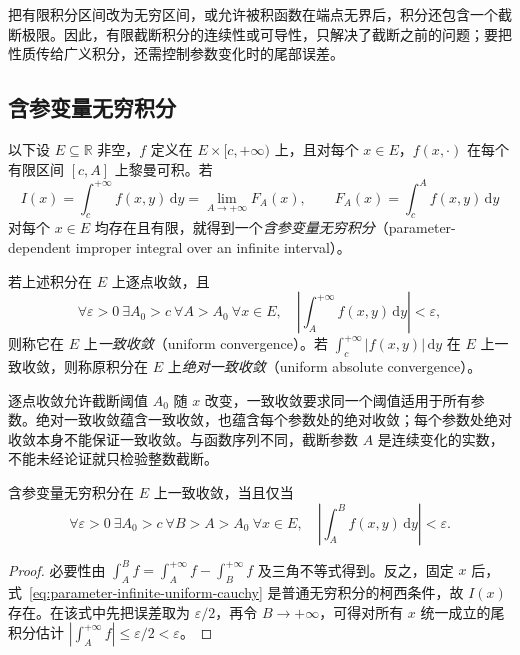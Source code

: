 把有限积分区间改为无穷区间，或允许被积函数在端点无界后，积分还包含一个截断极限。因此，有限截断积分的连续性或可导性，只解决了截断之前的问题；要把性质传给广义积分，还需控制参数变化时的尾部误差。

\subsection{含参变量无穷积分}
\label{subsec:parameter-dependent-infinite-integrals}

以下设 $E\subseteq\mathbb R$ 非空，$f$ 定义在 $E\times[c,+\infty)$ 上，且对每个 $x\in E$，$f(x,\cdot)$ 在每个有限区间 $[c,A]$ 上黎曼可积。若
\[
    I(x)=\int_c^{+\infty}f(x,y)\,\mathrm{d}y
    =\lim_{A\to+\infty}F_A(x),\qquad
    F_A(x)=\int_c^A f(x,y)\,\mathrm{d}y
\]
对每个 $x\in E$ 均存在且有限，就得到一个\emph{含参变量无穷积分}（parameter-dependent improper integral over an infinite interval）。

\begin{definition}[一致收敛与绝对一致收敛]
\label{def:parameter-infinite-uniform-convergence}
若上述积分在 $E$ 上逐点收敛，且
\begin{equation}
    \forall\varepsilon>0\ \exists A_0>c\ \forall A>A_0\ \forall x\in E,
    \quad\left|\int_A^{+\infty}f(x,y)\,\mathrm{d}y\right|<\varepsilon,
    \label{eq:parameter-infinite-uniform-tail}
\end{equation}
则称它在 $E$ 上\emph{一致收敛}（uniform convergence）。若 $\int_c^{+\infty}|f(x,y)|\,\mathrm{d}y$ 在 $E$ 上一致收敛，则称原积分在 $E$ 上\emph{绝对一致收敛}（uniform absolute convergence）。
\end{definition}

逐点收敛允许截断阈值 $A_0$ 随 $x$ 改变，一致收敛要求同一个阈值适用于所有参数。绝对一致收敛蕴含一致收敛，也蕴含每个参数处的绝对收敛；每个参数处绝对收敛本身不能保证一致收敛。与函数序列不同，截断参数 $A$ 是连续变化的实数，不能未经论证就只检验整数截断。

\begin{theorem}[一致收敛的柯西准则]
\label{thm:parameter-infinite-uniform-cauchy}
含参变量无穷积分在 $E$ 上一致收敛，当且仅当
\begin{equation}
    \forall\varepsilon>0\ \exists A_0>c\ \forall B>A>A_0\ \forall x\in E,
    \quad\left|\int_A^B f(x,y)\,\mathrm{d}y\right|<\varepsilon.
    \label{eq:parameter-infinite-uniform-cauchy}
\end{equation}
\end{theorem}

\begin{proof}
必要性由 $\int_A^B f=\int_A^{+\infty}f-\int_B^{+\infty}f$ 及三角不等式得到。反之，固定 $x$ 后，式~\eqref{eq:parameter-infinite-uniform-cauchy} 是普通无穷积分的柯西条件，故 $I(x)$ 存在。在该式中先把误差取为 $\varepsilon/2$，再令 $B\to+\infty$，可得对所有 $x$ 统一成立的尾积分估计 $|\int_A^{+\infty}f|\leq\varepsilon/2<\varepsilon$。
\end{proof}

